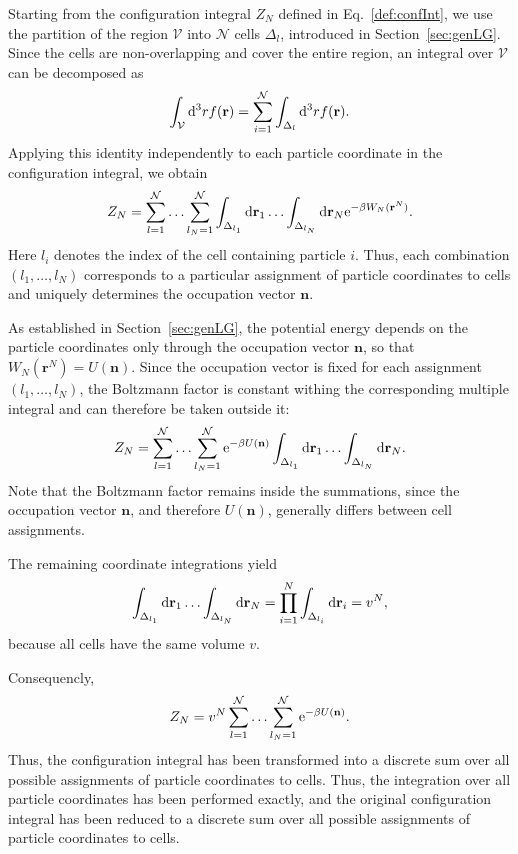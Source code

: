 \documentclass[12pt]{article}
\begin{document}
	Starting from the configuration integral $Z_N$ defined in Eq.~\eqref{def:confInt}, we use the partition of the region $\mathcal{V}$ into $\mathcal{N}$ cells $\Delta_{l}$, introduced in Section~\ref{sec:genLG}. Since the cells are non-overlapping and cover the entire region, an integral over $\mathcal{V}$ can be decomposed as
	\begin{equation}
		\int_{\mathcal{V}} {\rm d}^3 r f(\mathbf{r}) = \sum_{i=1}^{\mathcal{N}} \int_{\Delta_l} {\rm d}^3 r f(\mathbf{r}).
	\end{equation}
	Applying this identity independently to each particle coordinate in the configuration integral, we obtain
	\begin{equation}
		Z_N = \sum_{l=1}^{\mathcal{N}} \ldots \sum_{l_N=1}^{\mathcal{N}} \int_{\Delta_{l_1}} {\rm d} {\mathbf{r}_1} \ldots \int_{\Delta_{l_N}} {\rm d} {\mathbf{r}_N} {\rm e}^{-\beta W_N(\mathbf{r}^N)}.
	\end{equation}
	Here $l_i$ denotes the index of the cell containing particle $i$. Thus, each combination $(l_1, \ldots, l_N)$ corresponds to a particular assignment of particle coordinates to cells and uniquely determines the occupation vector $\mathbf{n}$.
	
	As established in Section~\ref{sec:genLG}, the potential energy depends on the particle coordinates only through the occupation vector $\mathbf{n}$, so that $W_N(\mathbf{r}^N) = U(\mathbf{n})$. Since the occupation vector is fixed for each assignment $(l_1, \ldots, l_N)$, the Boltzmann factor is constant withing the corresponding multiple integral and can therefore be taken outside it:
	\begin{equation}
		Z_N = \sum_{l=1}^{\mathcal{N}} \ldots \sum_{l_N=1}^{\mathcal{N}} {\rm e}^{-\beta U(\mathbf{n})} \int_{\Delta_{l_1}} {\rm d} {\mathbf{r}_1} \ldots \int_{\Delta_{l_N}} {\rm d} {\mathbf{r}_N}.
	\end{equation}
	Note that the Boltzmann factor remains inside the summations, since the occupation vector $\mathbf{n}$, and therefore $U(\mathbf{n})$, generally differs between cell assignments.
	
	The remaining coordinate integrations yield
	\begin{equation}
		\int_{\Delta_{l_1}} {\rm d} {\mathbf{r}_1} \ldots \int_{\Delta_{l_N}} {\rm d} {\mathbf{r}_N} = \prod\limits_{i=1}^{N} \int_{\Delta_{l_i}} {\rm d} {\mathbf{r}_i} = v^N,
	\end{equation}
	because all cells have the same volume $v$.
 	
	Consequencly,
	\begin{equation}
		\label{a:ZN2}
		Z_N = v^N \sum_{l=1}^{\mathcal{N}} \ldots \sum_{l_N=1}^{\mathcal{N}} {\rm e}^{-\beta U(\mathbf{n})}.
	\end{equation}
	Thus, the configuration integral has been transformed into a discrete sum over all possible assignments of particle coordinates to cells.
	Thus, the integration over all particle coordinates has been performed exactly, and the original configuration integral has been reduced to a discrete sum over all possible assignments of particle coordinates to cells.
	
\end{document}
